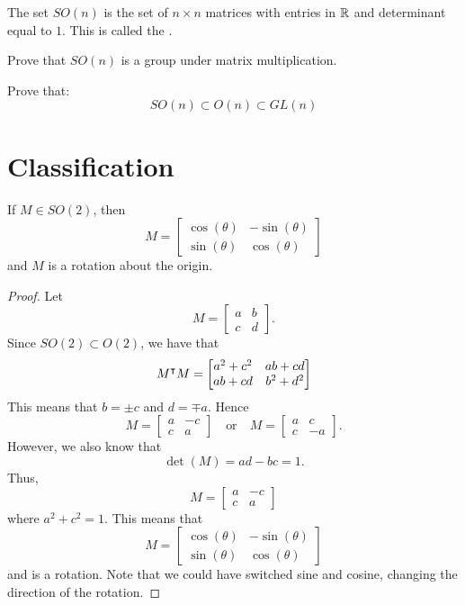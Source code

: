 \documentclass{ximera}
\begin{document}
\begin{definition}
  The set $SO(n)$ is the set of $n\times n$ matrices with entries in
  $\mathbb R$ and determinant equal to $1$. This is called the .
\end{definition}

\begin{exercise}
  Prove that $SO(n)$ is a group under matrix multiplication.
\end{exercise}


\begin{exercise}
  Prove that:
  \[
  SO(n) \subset O(n) \subset GL(n)
  \]
\end{exercise}

\section{Classification}



\begin{lemma}\label{L:SO}
  If $M\in SO(2)$, then
  \[
  M =
  \begin{bmatrix}
    \cos(\theta) & -\sin(\theta) \\
    \sin(\theta) & \cos(\theta)
  \end{bmatrix}
  \]
  and $M$ is a rotation about the origin.
  \begin{proof}
    Let
    \[
    M=
    \begin{bmatrix}
      a & b \\
      c & d
    \end{bmatrix}.
    \]
    Since $SO(2) \subset O(2)$, we have that
    \[
    M^\intercal M =
    \begin{bmatrix}
      a^2+c^2 & ab+cd\\
      ab + cd & b^2+d^2
    \end{bmatrix}
    \]
    This means that $b= \pm c$ and $d = \mp a$. Hence
    \[
    M = \begin{bmatrix}
      a & -c \\
      c & a
    \end{bmatrix}
    \quad\text{or}\quad
    M = \begin{bmatrix}
      a & c \\
      c & -a
    \end{bmatrix}.
    \]
    However, we also know that
    \[
    \det(M)  = ad-bc = 1.
    \]
    Thus, 
    \[
     M = \begin{bmatrix}
      a & -c \\
      c & a
    \end{bmatrix}
     \]
     where $a^2 + c^2 = 1$. This means that
     \[
     M =
     \begin{bmatrix}
       \cos(\theta) & -\sin(\theta) \\
       \sin(\theta) & \cos(\theta)
     \end{bmatrix}
     \]
     and is a rotation. Note that we could have switched sine and
     cosine, changing the direction of the rotation.
  \end{proof}
\end{lemma}
\end{document}
